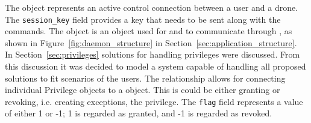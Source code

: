 The  object represents an active control connection between a user and a drone.
The \verb+session_key+ field provides a key that needs to be sent along with the commands.
The  object is an object used for  and  to communicate through , as shown in Figure~\ref{fig:daemon_structure} in Section~\ref{sec:application_structure}. \\

In Section~\ref{sec:privileges} solutions for handling privileges were discussed.
From this discussion it was decided to model a system capable of handling all proposed solutions to fit scenarios of the users.
The  relationship allows for connecting individual {Privilege} objects to a  object.
This is could be either granting or revoking, i.e. creating exceptions, the privilege.
The \verb+flag+ field represents a value of either 1 or -1; 1 is regarded as granted, and -1 is regarded as revoked.







